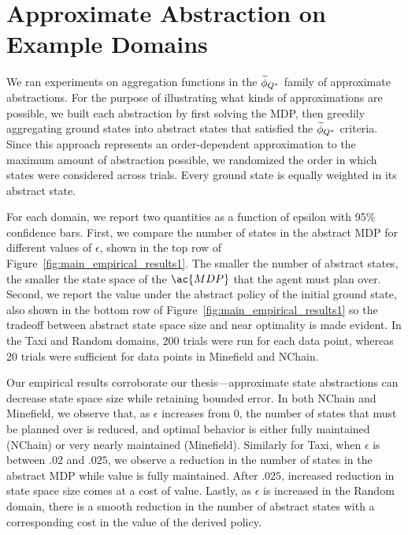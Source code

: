 \section{Approximate Abstraction on Example Domains}
We ran experiments on aggregation functions in the $\widetilde \phi_{Q^*}$ family of approximate abstractions.  
For the purpose of illustrating what kinds of approximations are possible, we built each abstraction by first solving the MDP, then greedily aggregating ground states into abstract states that satisfied the $\widetilde \phi_{Q^*}$ criteria. Since this approach represents an order-dependent approximation to the maximum amount of abstraction possible, we randomized the order in which states were considered across trials. Every ground state is equally weighted in its abstract state.

For each domain, we report two quantities as a function of epsilon with 95\% confidence bars. First, we compare the number of states in the abstract \ac{MDP} for different values of $\epsilon$, shown in the top row of Figure~\ref{fig:main_empirical_results1}. The smaller the number of abstract states, the smaller the state space of the $\ac{MDP}$ that the agent must plan over. Second, we report the value under the abstract policy of the initial ground state, also shown in the bottom row of Figure~\ref{fig:main_empirical_results1} so the tradeoff between abstract state space size and near optimality is made evident. In the Taxi and Random domains, 200 trials were run for each data point, whereas 20 trials were sufficient for data points in Minefield and NChain.

Our empirical results corroborate our thesis---approximate state abstractions can decrease state space size while retaining bounded error. In both NChain and Minefield, we observe that, as $\epsilon$ increases from $0$, the number of states that must be planned over is reduced, and optimal behavior is either fully maintained (NChain) or very nearly maintained (Minefield). Similarly for Taxi, when $\epsilon$ is between $.02$ and $.025$, we observe a reduction in the number of states in the abstract \ac{MDP} while value is fully maintained. After $.025$, increased reduction in state space size comes at a cost of value. Lastly, as $\epsilon$ is increased in the Random domain, there is a smooth reduction in the number of abstract states with a corresponding cost in the value of the derived policy.

